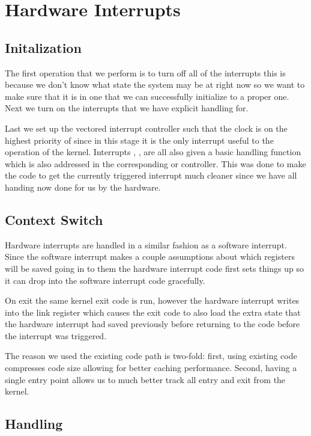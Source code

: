 \documentclass[pdftex,10pt,a4paper]{article}
\begin{document}
\newpage
\section*{Hardware Interrupts}

\subsection*{Initalization}

The first operation that we perform is to turn off all of the interrupts 
this is because we don't know what state the system may be at right now so we
want to make sure that it is in one that we can successfully initialize to a
proper one. Next we turn on the interrupts that we have explicit handling for.

Last we set up the vectored interrupt controller such that the clock is on the
highest priority of  since in this stage it is the only interrupt useful to
the operation of the kernel. Interrupts , ,  are all also given
a basic handling function which is also addressed in the corresponding  or 
 controller. This was done to make the code to get the currently triggered
interrupt much cleaner since we have all handing now done for us by the hardware.

\subsection*{Context Switch}

Hardware interrupts are handled in a similar fashion as a software interrupt.
Since the software interrupt makes a couple assumptions about which registers
will be saved going in to them the hardware interrupt code first sets things up
so it can drop into the software interrupt code gracefully.

On exit the same kernel exit code is run, however the hardware interrupt writes
 into the link register which causes the exit code to also load the extra
state that the hardware interrupt had saved previously before returning to the
code before the interrupt was triggered. 

The reason we used the existing code path is two-fold: first, using existing
code compresses code size allowing for better caching performance. Second,
having a single entry point allows us to much better track all entry and exit
from the kernel.

\subsection*{Handling}
\end{document}
